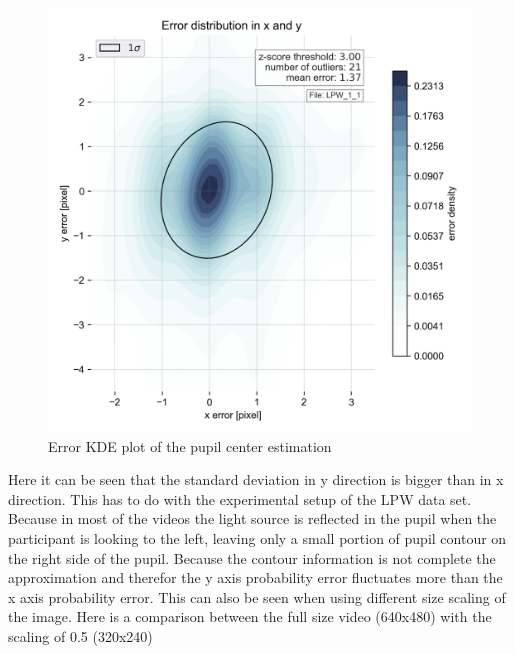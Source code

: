 \begin{figure}[h]
        \centering
        \includegraphics[width=\textwidth]{plots/LPW_1_1pre.png}
    \caption{Error KDE plot of the pupil center estimation}
    \label{fig:kde}
\end{figure}
Here it can be seen that the standard deviation in y direction is bigger than in x direction. This has to do with the experimental setup of the LPW data set. Because in most of the videos the light source is reflected in the pupil when the participant is looking to the left, leaving only a small portion of pupil contour on the right side of the pupil. Because the contour information is not complete the approximation and therefor the y axis probability error fluctuates more than the x axis probability error. This can also be seen when using different size scaling of the image. Here is a comparison between the full size video (640x480) with the scaling of 0.5 (320x240) 
